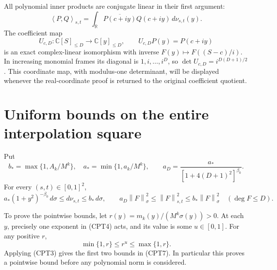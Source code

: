 \documentclass[11pt]{article}
\newcommand{\C}{\mathbb C}
\newcommand{\R}{\mathbb R}
\newcommand{\norm}[1]{\left\lVert#1\right\rVert}
\newcommand{\ip}[2]{\left\langle#1,#2\right\rangle}
\begin{document}
All polynomial inner products are conjugate linear in their first
argument:
\[
 \ip{P}{Q}_{s,t}
 =\int_{\R}\overline{P(c+iy)}Q(c+iy)\,d\nu_{s,t}(y).
\]
The coefficient map
\begin{equation}\tag{CPT5}
 U_{c,D}:\C[S]_{\le D}\longrightarrow\C[y]_{\le D},
 \qquad U_{c,D}P(y)=P(c+iy)
\end{equation}
is an exact complex-linear isomorphism with inverse
\(F(y)\mapsto F((S-c)/i)\).  In increasing monomial frames its
diagonal is \(1,i,\ldots,i^D\), so
\(\det U_{c,D}=i^{D(D+1)/2}\).  This coordinate map, with modulus-one
determinant, will be displayed whenever the real-coordinate proof is
returned to the original coefficient quotient.

\section{Uniform bounds on the entire interpolation square}

Put
\begin{equation}\tag{CPT6}
 b_*=\max\{1,A_k/M^k\},\quad a_*=\min\{1,a_k/M^k\},
 \qquad
 a_D=\frac{a_*}{[1+4(D+1)^2]^{\beta_0}}.
\end{equation}
For every \((s,t)\in[0,1]^2\),
\begin{equation}\tag{CPT7}
 a_*(1+y^2)^{-\beta_0}\,d\sigma
 \le d\nu_{s,t}\le b_*\,d\sigma,\qquad
 a_D\norm{F}_\sigma^2\le\norm{F}_{s,t}^2
 \le b_*\norm{F}_\sigma^2\quad(\deg F\le D).
\end{equation}

To prove the pointwise bounds, let
\(r(y)=m_k(y)/(M^k\sigma(y))>0\).
At each \(y\), precisely one exponent in (CPT4) acts, and its value
is some \(u\in[0,1]\).  For any positive \(r\),
\[
 \min\{1,r\}\le r^u\le\max\{1,r\}.
\]
Applying (CPT3) gives the first two bounds in (CPT7).
In particular this proves a pointwise bound before any polynomial norm
is considered.
\end{document}
